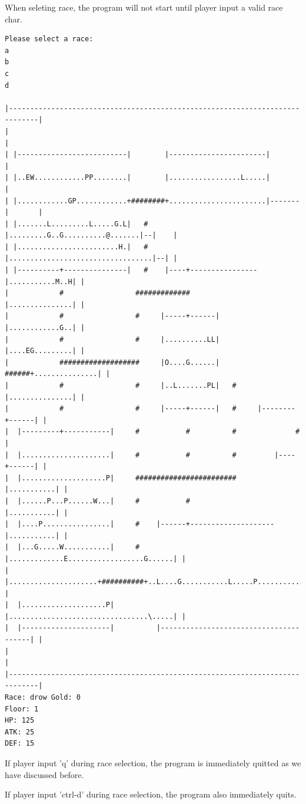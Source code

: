 \documentclass[11pt]{article}
\theoremstyle{plain}
\begin{document}
When seleting race, the program will not start until player input a valid
race char.
\begin{Verbatim}[fontsize=\scriptsize]
Please select a race:
a
b
c
d

|-----------------------------------------------------------------------------|
|                                                                             |
| |--------------------------|        |-----------------------|               |
| |..EW............PP........|        |.................L.....|               |
| |............GP............+########+.......................|-------|       |
| |.......L.........L.....G.L|   #    |.........G..G..........@.......|--|    |
| |........................H.|   #    |..................................|--| |
| |----------+---------------|   #    |----+----------------|...........M..H| |
|            #                 #############                |...............| |
|            #                 #     |-----+------|         |............G..| |
|            #                 #     |..........LL|         |....EG.........| |
|            ###################     |O....G......|   ######+...............| |
|            #                 #     |..L.......PL|   #     |...............| |
|            #                 #     |-----+------|   #     |--------+------| |
|  |---------+-----------|     #           #          #              #        |
|  |.....................|     #           #          #         |----+------| |
|  |....................P|     ########################         |...........| |
|  |......P...P......W...|     #           #                    |...........| |
|  |....P................|     #    |------+--------------------|...........| |
|  |...G.....W...........|     #    |.............E..................G......| |
|  |.....................+##########+..L....G...........L.....P.............| |
|  |....................P|          |.................................\.....| |
|  |---------------------|          |---------------------------------------| |
|                                                                             |
|-----------------------------------------------------------------------------|
Race: drow Gold: 0                                                     Floor: 1
HP: 125
ATK: 25
DEF: 15
\end{Verbatim}

If player input 'q' during race selection, 
the program is immediately quitted as we have discussed before.

If player input 'ctrl-d'  during race selection, 
the program also immediately quits.
\end{document}
